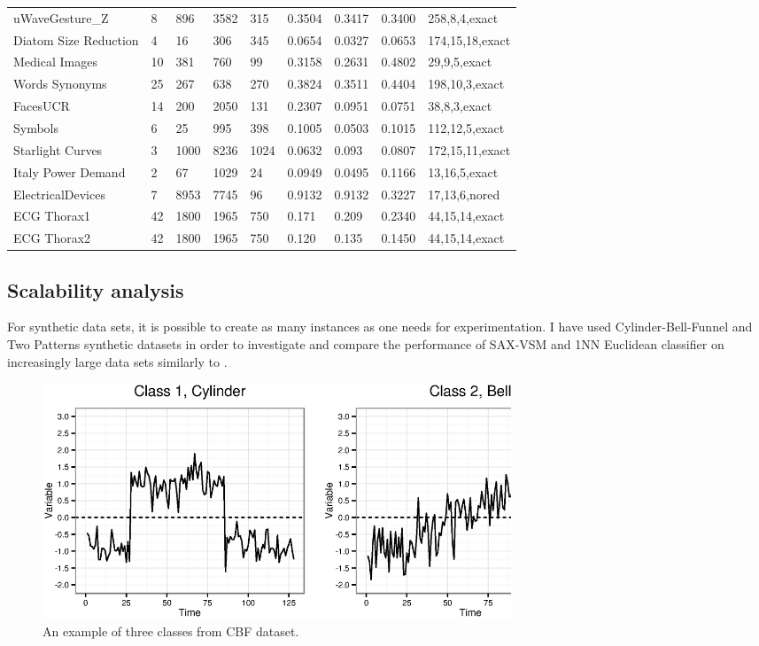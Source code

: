 \begin{table}[t!]
{{\begin{tabularx}{\linewidth}{@{} l *7X @{} l}
uWaveGesture\_Z & 8 & 896 & 3582 & 315 & 0.3504 & 0.3417 & 0.3400 & 258,8,4,exact \\
Diatom Size Reduction & 4 & 16 & 306 & 345 & 0.0654 & 0.0327 & 0.0653 & 174,15,18,exact \\
Medical Images & 10 & 381 & 760 & 99 & 0.3158 & 0.2631 & 0.4802 & 29,9,5,exact \\
Words Synonyms & 25 & 267 & 638 & 270 & 0.3824 & 0.3511 & 0.4404 & 198,10,3,exact \\
FacesUCR & 14 & 200 & 2050 & 131 & 0.2307 & 0.0951 & 0.0751 & 38,8,3,exact \\
Symbols & 6 & 25 & 995 & 398 & 0.1005 & 0.0503 & 0.1015 & 112,12,5,exact \\
Starlight Curves & 3 & 1000 & 8236 & 1024 & 0.0632 & 0.093 & 0.0807 & 172,15,11,exact \\
Italy Power Demand & 2 & 67 & 1029 & 24 & 0.0949 & 0.0495 & 0.1166 & 13,16,5,exact \\
ElectricalDevices & 7 & 8953 & 7745 & 96 & 0.9132 & 0.9132 & 0.3227 & 17,13,6,nored \\
ECG Thorax1 & 42 & 1800 & 1965 & 750 & 0.171 & 0.209 & 0.2340 & 44,15,14,exact \\
ECG Thorax2 & 42 & 1800 & 1965 & 750 & 0.120 & 0.135 & 0.1450 & 44,15,14,exact \\
\hline
\end{tabularx}
}}
\end{table}

\newpage

\subsection{Scalability analysis}
For synthetic data sets, it is possible to create as many instances as one needs for experimentation.
I have used Cylinder-Bell-Funnel \cite{citeulike:12563781} and Two Patterns \cite{} synthetic datasets in 
order to investigate and compare the performance of SAX-VSM and 1NN Euclidean classifier on increasingly 
large data sets similarly to \cite{citeulike:10358271}.

\begin{figure}[t!]
   \centering
   \includegraphics[width=140mm]{figures/cbf.ps}
   \caption{An example of three classes from CBF dataset.}
   \label{fig:cbf}
\end{figure}

